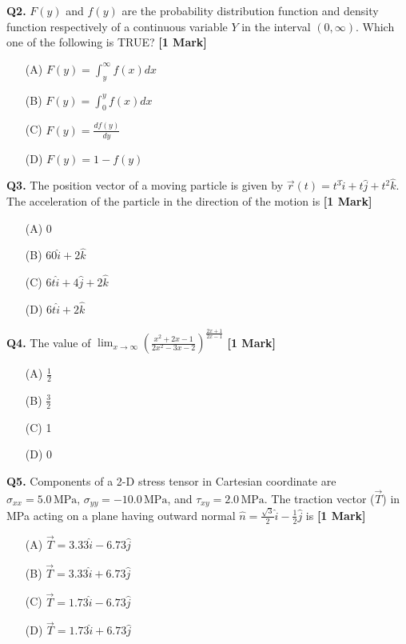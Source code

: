 \documentclass[11pt]{article}
\newcommand{\questiona}[2]{
    \noindent\textbf{Q#2.} #1 \hfill \textbf{[1 Mark]}
}
\begin{document}
\questiona{\( F(y) \) and \( f(y) \) are the probability distribution function and density function respectively of a continuous variable \( Y \) in the interval \((0, \infty)\). Which one of the following is TRUE?}{2}
\begin{enumerate}
    \item[(A)] \( F(y) = \int_{y}^{\infty} f(x) dx \)  
    \item[(B)] \( F(y) = \int_{0}^{y} f(x) dx \)  
    \item[(C)] \( F(y) = \frac{df(y)}{dy} \)  
    \item[(D)] \( F(y) = 1 - f(y) \)  
\end{enumerate}
\vspace{0.5cm}

\questiona{The position vector of a moving particle is given by \( \vec{r}(t) = t^3\hat{i} + t\hat{j} + t^2\hat{k} \). The acceleration of the particle in the direction of the motion is}{3}
\begin{enumerate}
    \item[(A)] 0  
    \item[(B)] \( 60\hat{i} + 2\hat{k} \)  
    \item[(C)] \( 6t\hat{i} + 4\hat{j} + 2\hat{k} \)  
    \item[(D)] \( 6t\hat{i} + 2\hat{k} \)  
\end{enumerate}
\vspace{0.5cm}

\questiona{The value of \(\lim_{x \to \infty} \left( \frac{x^2 + 2x - 1}{2x^2 - 3x - 2} \right)^{\frac{2x + 1}{2x - 1}} \)}{4}
\begin{enumerate}
    \item[(A)] \(\frac{1}{2}\)  
    \item[(B)] \(\frac{3}{2}\)  
    \item[(C)] 1  
    \item[(D)] 0  
\end{enumerate}
\vspace{0.5cm}

\questiona{Components of a 2-D stress tensor in Cartesian coordinate are \(\sigma_{xx} = 5.0 \, \text{MPa}, \, \sigma_{yy} = -10.0 \, \text{MPa}\), and \(\tau_{xy} = 2.0 \, \text{MPa}\). The traction vector (\(\vec{T}\)) in MPa acting on a plane having outward normal \(\hat{n} = \frac{\sqrt{3}}{2} \hat{i} - \frac{1}{2} \hat{j}\) is}{5}
\begin{enumerate}
    \item[(A)] \(\vec{T} = 3.33\hat{i} - 6.73\hat{j}\)  
    \item[(B)] \(\vec{T} = 3.33\hat{i} + 6.73\hat{j}\)  
    \item[(C)] \(\vec{T} = 1.73\hat{i} - 6.73\hat{j}\)  
    \item[(D)] \(\vec{T} = 1.73\hat{i} + 6.73\hat{j}\)  
\end{enumerate}
\vspace{0.5cm}
\end{document}
